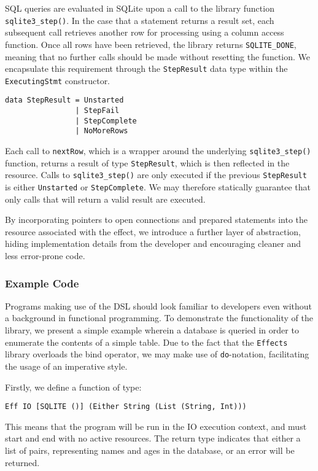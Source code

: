 \documentclass[preprint]{sigplanconf}
\begin{document}
SQL queries are evaluated in SQLite upon a call to the library function \texttt{sqlite3\_step()}. In the case that a statement returns a result set, each subsequent call retrieves another row for processing using a column access function. Once all rows have been retrieved, the library returns \texttt{SQLITE\_DONE}, meaning that no further calls should be made without resetting the function. We encapsulate this requirement through the \texttt{StepResult} data type within the \texttt{ExecutingStmt} constructor. 

\begin{verbatim}
data StepResult = Unstarted
                | StepFail
                | StepComplete
                | NoMoreRows
\end{verbatim}
Each call to \texttt{nextRow}, which is a wrapper around the underlying \texttt{sqlite3\_step()} function, returns a result of type \texttt{StepResult}, which is then reflected in the resource. Calls to \texttt{sqlite3\_step()} are only executed if the previous \texttt{StepResult} is either \texttt{Unstarted} or \texttt{StepComplete}. We may therefore statically guarantee that only calls that will return a valid result are executed. 

By incorporating pointers to open connections and prepared statements into the resource associated with the effect, we introduce a further layer of abstraction, hiding implementation details from the developer and encouraging cleaner and less error-prone code. 

\subsubsection{Example Code}
Programs making use of the DSL should look familiar to developers even without a background in functional programming. To demonstrate the functionality of the library, we present a simple example wherein a database is queried in order to enumerate the contents of a simple table. Due to the fact that the \texttt{Effects} library overloads the bind operator, we may make use of \texttt{do}-notation, facilitating the usage of an imperative style.

Firstly, we define a function of type:
\begin{verbatim}
Eff IO [SQLITE ()] (Either String (List (String, Int)))
\end{verbatim}
This means that the program will be run in the IO execution context, and must start and end with no active resources. The return type indicates that either a list of  pairs, representing names and ages in the database, or an error will be returned. 
\end{document}
